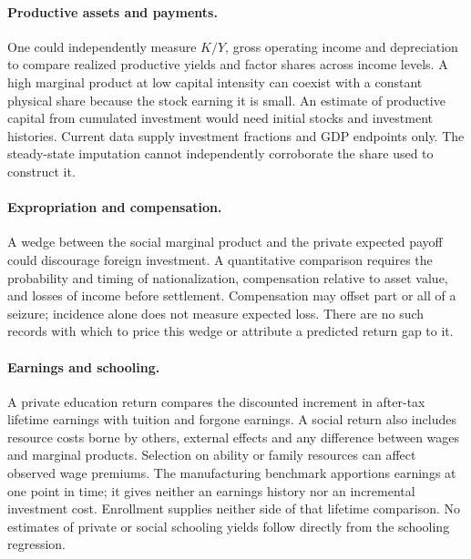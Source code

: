 \documentclass[11pt]{article}
\begin{document}
\paragraph{Productive assets and payments.}
One could independently measure $K/Y$, gross operating income and depreciation to compare realized productive yields and factor shares across income levels. A high marginal product at low capital intensity can coexist with a constant physical share because the stock earning it is small. An estimate of productive capital from cumulated investment would need initial stocks and investment histories. Current data supply investment fractions and GDP endpoints only. The steady-state imputation cannot independently corroborate the share used to construct it.

\paragraph{Expropriation and compensation.}
A wedge between the social marginal product and the private expected payoff could discourage foreign investment. A quantitative comparison requires the probability and timing of nationalization, compensation relative to asset value, and losses of income before settlement. Compensation may offset part or all of a seizure; incidence alone does not measure expected loss. There are no such records with which to price this wedge or attribute a predicted return gap to it.

\paragraph{Earnings and schooling.}
A private education return compares the discounted increment in after-tax lifetime earnings with tuition and forgone earnings. A social return also includes resource costs borne by others, external effects and any difference between wages and marginal products. Selection on ability or family resources can affect observed wage premiums. The manufacturing benchmark apportions earnings at one point in time; it gives neither an earnings history nor an incremental investment cost. Enrollment supplies neither side of that lifetime comparison. No estimates of private or social schooling yields follow directly from the schooling regression.
\end{document}
